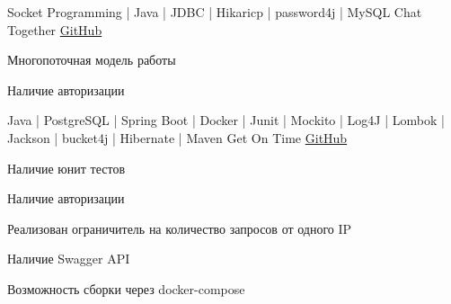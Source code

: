 \begin{cventries}
  \cventry
    {Socket Programming | Java | JDBC | Hikaricp | password4j | MySQL} %
    {Chat Together} %
    {\href{https://github.com/MasoNord/chat-together}{GitHub}} %
    {} %
    {
      \begin{cvitems} %
        \item {Многопоточная модель работы}
        \item {Наличие авторизации}
      \end{cvitems}
    }
    \cventry
      {Java | PostgreSQL | Spring Boot | Docker | Junit | Mockito | Log4J | Lombok | Jackson | bucket4j | Hibernate | Maven} %
      {Get On Time} %
      {\href{https://github.com/MasoNord/Get-On-Time}{GitHub}} %
      {} %
      {
        \begin{cvitems} %
          \item {Наличие юнит тестов}
          \item {Наличие авторизации}
          \item {Реализован ограничитель на количество запросов от одного IP}
          \item {Наличие Swagger API}
          \item {Возможность сборки через docker-compose}
        \end{cvitems}
      }
\end{cventries}
